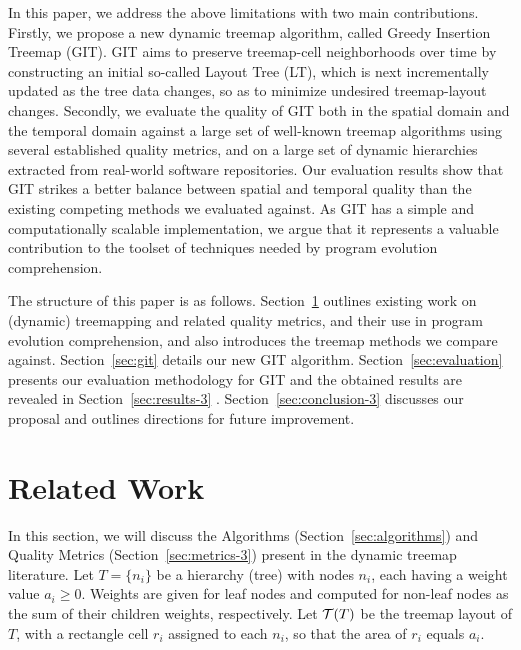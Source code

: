 In this paper, we address the above limitations with two main contributions. Firstly, we propose a new dynamic treemap algorithm, called Greedy Insertion Treemap (GIT). GIT aims to preserve treemap-cell neighborhoods over time by constructing an initial so-called Layout Tree (LT), which is next incrementally updated as the tree data changes, so as to minimize undesired treemap-layout changes.
Secondly, we evaluate the quality of GIT both in the spatial domain and the temporal domain against a large set of well-known treemap algorithms using several established quality metrics, and on a large set of dynamic hierarchies extracted from real-world software repositories. Our evaluation results show that GIT strikes a better balance between spatial and temporal quality than the existing competing methods we evaluated against. As GIT has a simple and computationally scalable implementation, we argue that it represents a valuable contribution to the toolset of techniques needed by program evolution comprehension.

The structure of this paper is as follows. Section~\ref{sec:related_work} outlines existing work on (dynamic) treemapping and related quality metrics, and their use in program evolution comprehension, and also introduces the treemap methods we compare against. Section~\ref{sec:git} details our new GIT algorithm. Section~\ref{sec:evaluation} presents our evaluation methodology for GIT and the obtained results are revealed in Section~\ref{sec:results-3} . Section~\ref{sec:conclusion-3} discusses our proposal and outlines directions for future improvement.


\section{Related Work}
\label{sec:related_work}

In this section, we will discuss the Algorithms (Section~\ref{sec:algorithms}) and Quality Metrics (Section~\ref{sec:metrics-3}) present in the dynamic treemap literature.
Let $T= \{n_i\}$ be a hierarchy (tree) with nodes $n_i$, each having a weight value $a_i \geq 0$. Weights are given for leaf nodes and computed for non-leaf nodes as the sum of their children weights, respectively. Let ${\cal T}(T)$ be the treemap layout of $T$, with a rectangle cell $r_i$ assigned to each $n_i$, so that the area of $r_i$ equals $a_i$.

